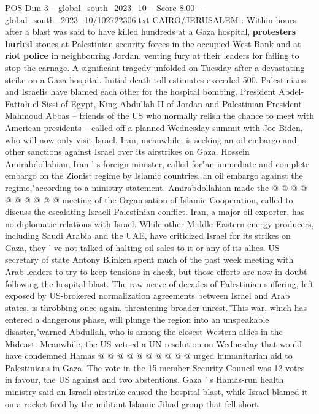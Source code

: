 \begin{textsample}{POS Dim 3 – global\_south\_2023\_10 – Score 8.00 – global\_south\_2023\_10/102722306.txt}  \label{ex:f3_pos_437}
CAIRO/JERUSALEM : Within hours after a blast was said to have killed hundreds at a Gaza hospital, \textbf{protesters} \textbf{hurled} stones at Palestinian security forces in the occupied West Bank and at \textbf{riot} \textbf{police} in neighbouring Jordan, venting fury at their leaders for failing to stop the carnage.
A significant tragedy unfolded on Tuesday after a devastating strike on a Gaza hospital.
Initial death toll estimates exceeded 500.
Palestinians and Israelis have blamed each other for the hospital bombing.
President Abdel-Fattah el-Sissi of Egypt, King Abdullah II of Jordan and Palestinian President Mahmoud Abbas -- friends of the US who normally relish the chance to meet with American presidents -- called off a planned Wednesday summit with Joe Biden, who will now only visit Israel.
Iran, meanwhile, is seeking an oil embargo and other sanctions against Israel over its airstrikes on Gaza.
Hossein Amirabdollahian, Iran ' s foreign minister, called for"an immediate and complete embargo on the Zionist regime by Islamic countries, an oil embargo against the regime,"according to a ministry statement.
Amirabdollahian made the @ @ @ @ @ @ @ @ @ @ meeting of the Organisation of Islamic Cooperation, called to discuss the escalating Israeli-Palestinian conflict.
Iran, a major oil exporter, has no diplomatic relations with Israel.
While other Middle Eastern energy producers, including Saudi Arabia and the UAE, have criticized Israel for its strikes on Gaza, they ' ve not talked of halting oil sales to it or any of its allies.
US secretary of state Antony Blinken spent much of the past week meeting with Arab leaders to try to keep tensions in check, but those efforts are now in doubt following the hospital blast.
The raw nerve of decades of Palestinian suffering, left exposed by US-brokered normalization agreements between Israel and Arab states, is throbbing once again, threatening broader unrest."This war, which has entered a dangerous phase, will plunge the region into an unspeakable disaster,"warned Abdullah, who is among the closest Western allies in the Mideast.
Meanwhile, the US vetoed a UN resolution on Wednesday that would have condemned Hamas @ @ @ @ @ @ @ @ @ @ urged humanitarian aid to Palestinians in Gaza.
The vote in the 15-member Security Council was 12 votes in favour, the US against and two abstentions.
Gaza ' s Hamas-run health ministry said an Israeli airstrike caused the hospital blast, while Israel blamed it on a rocket fired by the militant Islamic Jihad group that fell short.

\end{textsample}
